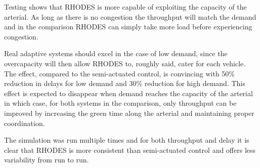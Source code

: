 Testing shows that RHODES is more capable of exploiting the capacity of the arterial. As long as there is no congestion the throughput will match the demand and in the comparison RHODES can simply take more load before experiencing congestion.

Real adaptive systems should excel in the case of low demand, since the overcapacity will then allow RHODES to, roughly said, cater for each vehicle. The effect, compared to the semi-actuated control, is convincing with 50\% reduction in delays for low demand and 30\% reduction for high demand. This effect is expected to disappear when demand reaches the capacity of the arterial in which case, for both systems in the comparison, only throughput can be improved by increasing the green time along the arterial and maintaining proper coordination.

The simulation was run multiple times and for both throughput and delay it is clear that RHODES is more consistent than semi-actuated control and offers less variability from run to run.